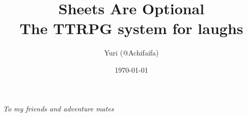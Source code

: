\documentclass{book}
\title{Sheets Are Optional\\
\large The TTRPG system for laughs}
\author{Yuri (@Achifaifa)}
\date{\today}
\begin{document}
\maketitle
\vspace*{\fill}
\hfill
\begin{center}
\textit{To my friends and adventure mates}
\end{center}
\vspace{\fill}
\tableofcontents


\setcounter{page}{1}





\pagebreak

\pagebreak

\pagebreak
\end{document}
